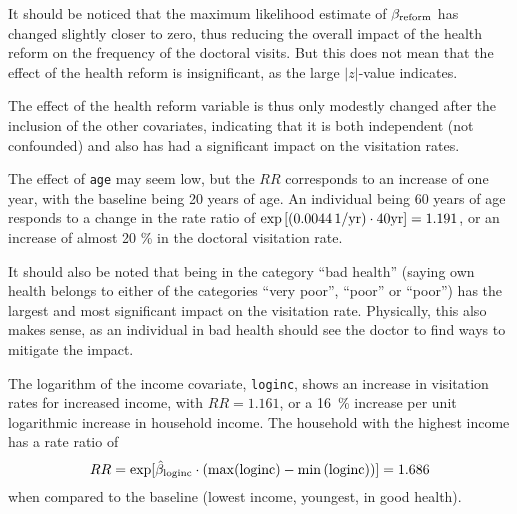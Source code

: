 \documentclass[a4paper,11pt]{article}
\begin{document}
\begin{enumerate}[label=2\alph*)]
        It should be noticed that the maximum likelihood estimate of $\beta_{\rm reform}$ has changed slightly closer to zero, thus reducing the overall impact of the health reform on the frequency of the doctoral visits. But this does not mean that the effect of the health reform is insignificant, as the large $|z|$-value indicates. 
        
        The effect of the health reform variable is thus only modestly changed after the inclusion of the other covariates, indicating that it is both independent (not confounded) and also has had a significant impact on the visitation rates.
        
        The effect of \texttt{age} may seem low, but the $RR$ corresponds to an increase of one year, with the baseline being 20 years of age. An individual being 60 years of age responds to a change in the rate ratio of $\exp\left[\rm (0.0044 \, 1/yr) \cdot 40 yr \right] = 1.191$, or an increase of almost 20 \% in the doctoral visitation rate. 

        It should also be noted that being in the category ``bad health'' (saying own health belongs to either of the categories ``very poor'', ``poor'' or ``poor'') has the largest and most significant impact on the visitation rate. Physically, this also makes sense, as an individual in bad health should see the doctor to find ways to mitigate the impact.

        The logarithm of the income covariate, \texttt{loginc}, shows an increase in visitation rates for increased income, with $RR = 1.161$, or a 16~\% increase per unit logarithmic increase in household income. The household with the highest income has a rate ratio of
        \[
        RR = \exp[\hat{\beta}_{\rm loginc} \cdot \left( \max({\rm loginc}) - \min\left( {\rm loginc} \right) \right)] = 1.686
        \]
        when compared to the baseline (lowest income, youngest, in good health).

\end{enumerate} 

\clearpage
\end{document}
